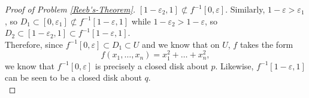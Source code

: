 \documentclass[reqno]{amsart}
\theoremstyle{definition}
\theoremstyle{remark}
\begin{document}
\begin{proof}[Proof of Problem \ref{Reeb's-Theorem}]
         $\left[ 1-\varepsilon_2,1 \right] \not \subset 
         f^{-1}\left[ 0,\varepsilon \right] $.
         Similarly,
         $1- \varepsilon > \varepsilon_1$, so
         $D_1 \subset \left[ 0,\varepsilon_1 \right] 
         \not \subset f^{-1}\left[ 1-\varepsilon,1 \right] $
         while $1-\varepsilon_2 > 1- \varepsilon$, so
         $D_2 \subset \left[ 1-\varepsilon_2, 1 \right] 
         \subset f^{-1}\left[ 1-\varepsilon,1 \right] $.\\
         \linebreak
         Therefore,
         since $f^{-1}\left[ 0,\varepsilon \right] \subset D_1
         \subset U$ and
         we know that on
         $U$, $f$ takes the form
         \[
         f\left( x_1,\ldots,x_n \right) 
         = x_1^2 + \ldots + x_n^2,
         \] 
         we know that
         $f^{-1}\left[ 0,\varepsilon \right] $ is
         precisely a closed disk about
         $p$. Likewise,
         $f^{-1}\left[ 1-\varepsilon,1 \right] $ can
         be seen to be a closed disk about $q$.\\


\end{proof}
\end{document}
